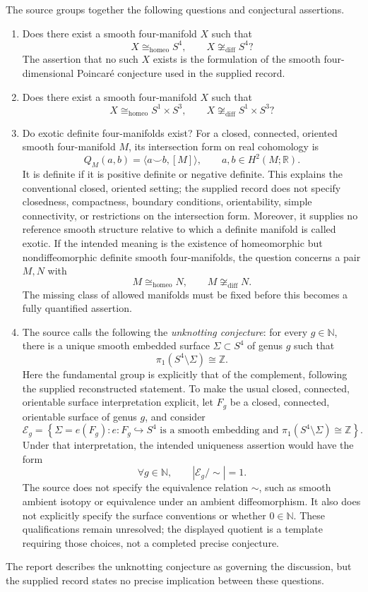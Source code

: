 \documentclass[11pt]{article}
\newcommand{\N}{\mathbb{N}}
\newcommand{\Z}{\mathbb{Z}}
\newcommand{\R}{\mathbb{R}}
\begin{document}
The source groups together the following questions and conjectural assertions.
\begin{enumerate}
\item Does there exist a smooth four-manifold \(X\) such that
\[
X\cong_{\mathrm{homeo}}S^4,
\qquad
X\not\cong_{\mathrm{diff}}S^4?
\]
The assertion that no such \(X\) exists is the formulation of the smooth four-dimensional Poincar\'e conjecture used in the supplied record.
\item Does there exist a smooth four-manifold \(X\) such that
\[
X\cong_{\mathrm{homeo}}S^1\times S^3,
\qquad
X\not\cong_{\mathrm{diff}}S^1\times S^3?
\]
\item Do exotic definite four-manifolds exist? For a closed, connected, oriented smooth four-manifold \(M\), its intersection form on real cohomology is
\[
Q_M(a,b)=\langle a\smile b,[M]\rangle,
\qquad a,b\in H^2(M;\R).
\]
It is definite if it is positive definite or negative definite. This explains the conventional closed, oriented setting; the supplied record does not specify closedness, compactness, boundary conditions, orientability, simple connectivity, or restrictions on the intersection form. Moreover, it supplies no reference smooth structure relative to which a definite manifold is called exotic. If the intended meaning is the existence of homeomorphic but nondiffeomorphic definite smooth four-manifolds, the question concerns a pair \(M,N\) with
\[
M\cong_{\mathrm{homeo}}N,
\qquad M\not\cong_{\mathrm{diff}}N.
\]
The missing class of allowed manifolds must be fixed before this becomes a fully quantified assertion.
\item The source calls the following the \emph{unknotting conjecture}: for every \(g\in\N\), there is a unique smooth embedded surface \(\Sigma\subset S^4\) of genus \(g\) such that
\[
\pi_1(S^4\setminus\Sigma)\cong\Z.
\]
Here the fundamental group is explicitly that of the complement, following the supplied reconstructed statement. To make the usual closed, connected, orientable surface interpretation explicit, let \(F_g\) be a closed, connected, orientable surface of genus \(g\), and consider
\[
\mathcal E_g=
\left\{\Sigma=e(F_g): e:F_g\hookrightarrow S^4
\text{ is a smooth embedding and }
\pi_1(S^4\setminus\Sigma)\cong\Z\right\}.
\]
Under that interpretation, the intended uniqueness assertion would have the form
\[
\forall g\in\N,\qquad |\mathcal E_g/\!\sim|=1.
\]
The source does not specify the equivalence relation \(\sim\), such as smooth ambient isotopy or equivalence under an ambient diffeomorphism. It also does not explicitly specify the surface conventions or whether \(0\in\N\). These qualifications remain unresolved; the displayed quotient is a template requiring those choices, not a completed precise conjecture.
\end{enumerate}
The report describes the unknotting conjecture as governing the discussion, but the supplied record states no precise implication between these questions.
\end{document}

